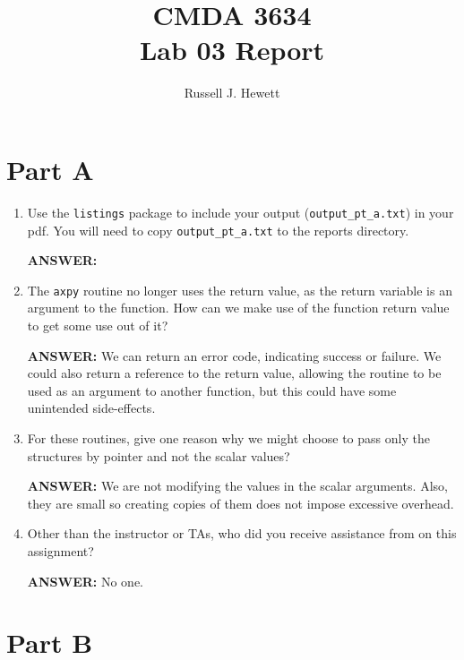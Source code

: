 \documentclass[letter]{article}
\title{CMDA 3634 \\ Lab 03 Report}
\author{Russell J. Hewett}
\begin{document}
\maketitle

\section*{Part A}

\begin{enumerate}
    \item Use the \texttt{listings} package to include your output (\texttt{output\_pt\_a.txt}) in your pdf.  You will need to copy \texttt{output\_pt\_a.txt} to the reports directory.
    
    \textbf{ANSWER:} %
	

    \item The \texttt{axpy} routine no longer uses the return value, as the return variable is an argument to the function.  How can we make use of the function return value to get some use out of it?

    \textbf{ANSWER:} We can return an error code, indicating success or failure.  We could also return a reference to the return value, allowing the routine to be used as an argument to another function, but this could have some unintended side-effects.

    \item For these routines, give one reason why we might choose to pass only the structures by pointer and not the scalar values?
    
    \textbf{ANSWER:} We are not modifying the values in the scalar arguments.  Also, they are small so creating copies of them does not impose excessive overhead.

    \item Other than the instructor or TAs, who did you receive assistance from on this assignment?
    
    \textbf{ANSWER:} No one.
\end{enumerate}

\section*{Part B}





\end{document}
